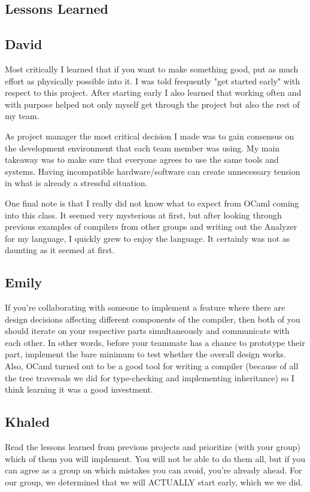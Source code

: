 \begin{homeworkProblem}
	\chapter{Lessons Learned}
	\section{David}
	Most critically I learned that if you want to make something good, put as much effort as physically possible into it. I was told frequently "get started early" with respect to this project. After starting early I also learned that working often and with purpose helped not only myself get through the project but also the rest of my team. 
	
	As project manager the most critical decision I made was to gain consensus on the development environment that each team member was using. My main takeaway was to make sure that everyone agrees to use the same tools and systems. Having incompatible hardware/software can create unnecessary tension in what is already a stressful situation. 
	
	One final note is that I really did not know what to expect from OCaml coming into this class. It seemed very mysterious at first, but after looking through previous examples of compilers from other groups and writing out the Analyzer for my language, I quickly grew to enjoy the language. It certainly was not as daunting as it seemed at first. 
	\section{Emily}
	If you're collaborating with someone to implement a feature where there are design decisions affecting different components of the compiler, then both of you should iterate on your respective parts simultaneously and communicate with each other. In other words, before your teammate has a chance to prototype their part, implement the bare minimum to test whether the overall design works. Also, OCaml turned out to be a good tool for writing a compiler (because of all the tree traversals we did for type-checking and implementing inheritance) so I think learning it was a good investment.
	\section{Khaled}
	Read the lessons learned from previous projects and prioritize (with your group) which of them you will implement. You will not be able to do them all, but if you can agree as a group on which mistakes you can avoid, you're already ahead. For our group, we determined that we will ACTUALLY start early, which we we did.
	

\end{homeworkProblem}
